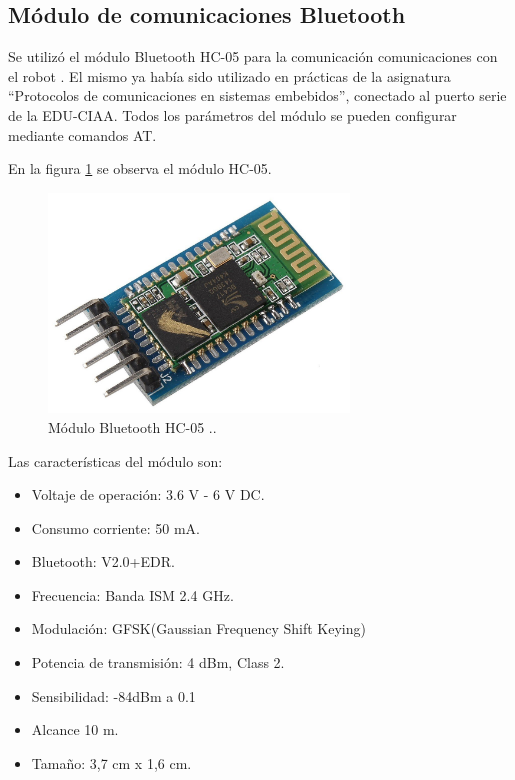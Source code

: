 \subsection{Módulo de comunicaciones Bluetooth}

Se utilizó el módulo Bluetooth HC-05 para la comunicación comunicaciones con el robot \citep{HC05}. El mismo ya había sido utilizado en  prácticas de la asignatura “Protocolos de comunicaciones en sistemas embebidos”, conectado al puerto serie de la EDU-CIAA. Todos los parámetros del módulo se pueden configurar mediante comandos AT. 

En la figura \ref{fig:moduloHC05} se observa el módulo HC-05.


\begin{figure}[h]
	\centering
	\includegraphics[width=8cm]{./Figures/HC05.jpeg}
	\caption{Módulo Bluetooth HC-05 .\protect\footnotemark.}
	\label{fig:moduloHC05}
\end{figure}



Las características del módulo son:
\begin{itemize}
	\item Voltaje de operación: 3.6 V - 6 V DC.
	\item Consumo corriente: 50 mA.
	\item Bluetooth: V2.0+EDR.
	\item Frecuencia: Banda ISM 2.4 GHz.
	\item Modulación: GFSK(Gaussian Frequency Shift Keying)
	\item Potencia de transmisión: 4 dBm, Class 2.
	\item Sensibilidad: -84dBm a 0.1%
	\item Alcance 10 m.
	\item Tamaño: 3,7 cm x 1,6 cm.
\end{itemize}




